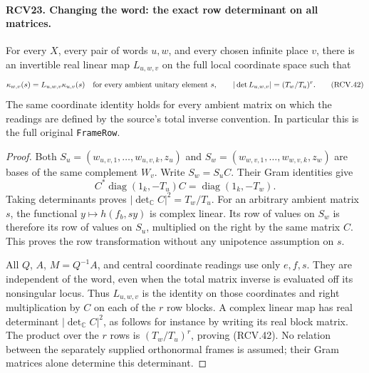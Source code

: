 \documentclass[11pt,a4paper]{article}
\numberwithin{equation}{section}
\theoremstyle{remark}\newtheorem{remark}[theorem]{Remark}
\begin{document}
\paragraph{RCV23. Changing the word: the exact row determinant on all matrices.}
\label{claim:RCV23}
For every \(X\), every pair of words \(u,w\), and every
chosen infinite place \(v\), there is an invertible real linear
map \(L_{u,w,v}\) on the full local coordinate space such that
\[
 \kappa_{w,v}(s)=L_{u,w,v}\kappa_{u,v}(s)
       \quad\hbox{for every ambient unitary element }s,
 \qquad |\det L_{u,w,v}|=(T_w/T_u)^r.
\tag{RCV.42}
\]
The same coordinate identity holds for every ambient matrix on which
the readings are defined by the source's total inverse convention.
In particular this is the full original \texttt{Frame\allowbreak Row}.
\begin{proof}
Both \(S_u=(w_{u,v,1},\ldots,w_{u,v,k},z_u)\) and
\(S_w=(w_{w,v,1},\ldots,w_{w,v,k},z_w)\) are bases of the
same complement \(W_v\).  Write \(S_w=S_u C\).  Their Gram
identities give
\[
       C^*\operatorname{diag}(1_k,-T_u)C
                           =\operatorname{diag}(1_k,-T_w).
\]
Taking determinants proves \(|\det_{\mathbb C}C|^2=T_w/T_u\).
For an arbitrary ambient matrix \(s\), the functional
\(y\mapsto h(f_b,sy)\) is complex linear.  Its row of values
on \(S_w\) is therefore its row of values on \(S_u\), multiplied
on the right by the same matrix \(C\).  This proves the row
transformation without any unipotence assumption on \(s\).

All \(Q\), \(A\), \(M=Q^{-1}A\), and central coordinate
readings use only \(e,f,s\).  They are independent of the word,
even when the total matrix inverse is evaluated off its nonsingular
locus.  Thus \(L_{u,w,v}\) is the identity on those coordinates
and right multiplication by \(C\) on each of the \(r\) row
blocks.  A complex linear map has real determinant
\(|\det_{\mathbb C}C|^2\), as follows for instance by writing
its real block matrix.  The product over the \(r\) rows is
\((T_w/T_u)^r\), proving (RCV.42).
No relation between the separately supplied orthonormal frames is
assumed; their Gram matrices alone determine this determinant.
\end{proof}

\end{document}
